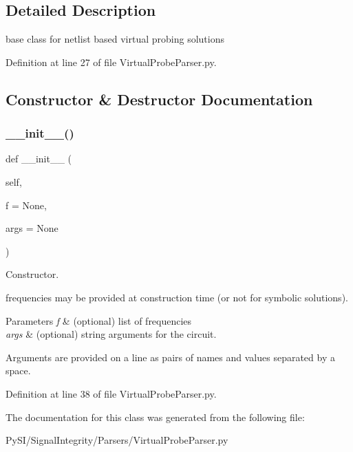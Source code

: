 \subsection{Detailed Description}
base class for netlist based virtual probing solutions 

Definition at line 27 of file Virtual\+Probe\+Parser.\+py.



\subsection{Constructor \& Destructor Documentation}
\mbox{\label{classSignalIntegrity_1_1Parsers_1_1VirtualProbeParser_1_1VirtualProbeParser_af9856388f7022892c3159ad55872a27e}} 
\subsubsection{\texorpdfstring{\+\_\+\+\_\+init\+\_\+\+\_\+()}{\_\_init\_\_()}}
{\footnotesize\ttfamily def \+\_\+\+\_\+init\+\_\+\+\_\+ (\begin{DoxyParamCaption}\item[{}]{self,  }\item[{}]{f = {\ttfamily None},  }\item[{}]{args = {\ttfamily None} }\end{DoxyParamCaption})}



Constructor. 

frequencies may be provided at construction time (or not for symbolic solutions).


\begin{DoxyParams}{Parameters}
{\em f} & (optional) list of frequencies \\
\hline
{\em args} & (optional) string arguments for the circuit.\\
\hline
\end{DoxyParams}
Arguments are provided on a line as pairs of names and values separated by a space. 

Definition at line 38 of file Virtual\+Probe\+Parser.\+py.



The documentation for this class was generated from the following file\+:\begin{DoxyCompactItemize}
\item 
Py\+S\+I/\+Signal\+Integrity/\+Parsers/Virtual\+Probe\+Parser.\+py\end{DoxyCompactItemize}

